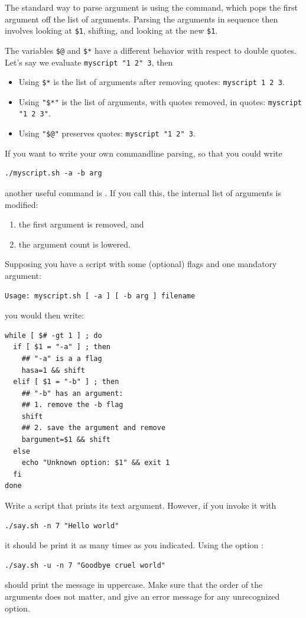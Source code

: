 The standard way to parse argument is using the 
command, which pops the first argument off the list of arguments.
Parsing the arguments in sequence then involves looking at \verb+$1+,
shifting, and looking at the new \verb+$1+.
%

The variables \verb+$@+ and \verb+$*+ have a different behavior with
respect to double quotes. Let's say we evaluate
\verb+myscript "1 2" 3+, then
\begin{itemize}
\item Using \verb+$*+ is the list of arguments after removing quotes:
  \verb+myscript 1 2 3+.
\item Using
  \verb+"$*"+ is the list of arguments, with quotes removed, in quotes:
  \verb+myscript "1 2 3"+.
\item Using
  \verb+"$@"+ preserves quotes:
  \verb+myscript "1 2" 3+.
\end{itemize}

If you want to write your own commandline parsing,
so that you could write
\begin{lstlisting}
./myscript.sh -a -b arg
\end{lstlisting}
another useful command is .
If you call this, the internal list of arguments is modified:
\begin{enumerate}
\item the first argument is removed, and
\item the argument count is lowered.
\end{enumerate}
Supposing you have a script with some (optional) flags
and one mandatory argument:
\begin{lstlisting}
Usage: myscript.sh [ -a ] [ -b arg ] filename
\end{lstlisting}
you would then write:
\begin{lstlisting}
while [ $# -gt 1 ] ; do
  if [ $1 = "-a" ] ; then 
    ## "-a" is a a flag
    hasa=1 && shift
  elif [ $1 = "-b" ] ; then
    ## "-b" has an argument:
    ## 1. remove the -b flag
    shift
    ## 2. save the argument and remove
    bargument=$1 && shift
  else
    echo "Unknown option: $1" && exit 1
  fi
done
\end{lstlisting}

\begin{exercise}
  Write a script  that prints its text argument. However, if you invoke it with 
\begin{lstlisting}
./say.sh -n 7 "Hello world"
\end{lstlisting}
  it should be print it as many times as you indicated. Using the
  option :
\begin{lstlisting}
./say.sh -u -n 7 "Goodbye cruel world"
\end{lstlisting}
should print the message in uppercase.
Make sure that the order of
the arguments does not matter, and give an error message for any
unrecognized option.
\end{exercise}

